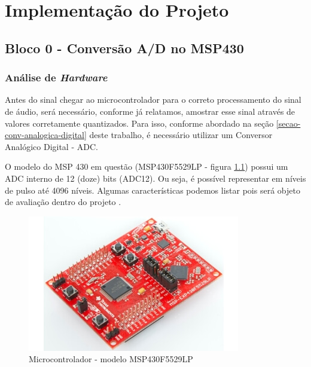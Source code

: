 \chapter{Implementação do Projeto}

\section{Bloco 0 - Conversão A/D no MSP430}
	
	\subsection{Análise de \textit{Hardware}}
	
		Antes do sinal chegar ao microcontrolador para o correto processamento do sinal de áudio, será necessário, conforme já relatamos, amostrar esse sinal através de valores corretamente quantizados. Para isso, conforme abordado na seção \ref{secao-conv-analogica-digital} deste trabalho, é necessário utilizar um Conversor Analógico Digital - ADC.
		
		O modelo do MSP 430 em questão (MSP430F5529LP - figura \ref{fig:main}) possui um ADC interno de 12 (doze) bits (ADC12). Ou seja, é possível representar em níveis de pulso até 4096 níveis. Algumas características podemos listar pois será objeto de avaliação dentro do projeto \cite{Davies2008}.
		
		\begin{figure}[th]
			\centering
			\includegraphics[scale=0.5]{figuras/micro/main}
			\caption{Microcontrolador - modelo MSP430F5529LP}
			\label{fig:main}
		\end{figure}
		
